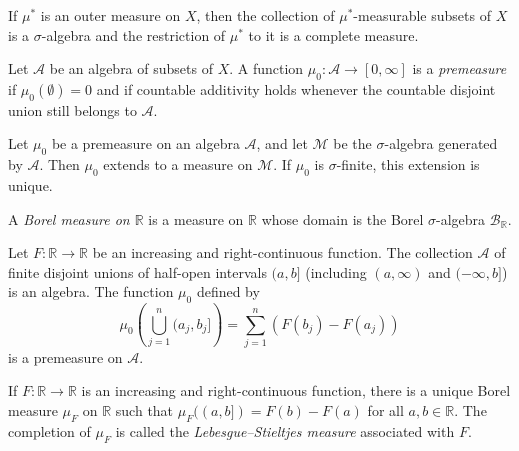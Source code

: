 \begin{theorem}[Caratheodory]
\label{theorem-caratheodory}
If $\mu^*$ is an outer measure on $X$, then
the collection of $\mu^*$-measurable subsets
of $X$ is a $\sigma$-algebra and the
restriction of $\mu^*$ to it is a complete
measure.
\end{theorem}

\begin{definition}
\label{definition-premeasure}
Let $\mathcal A$ be an algebra of subsets of
$X$. A function $\mu_0:\mathcal
A\to[0,\infty]$ is a {\it premeasure} if
$\mu_0(\emptyset)=0$ and if countable
additivity holds whenever the countable
disjoint union still belongs to $\mathcal A$.
\end{definition}

\begin{theorem}
\label{theorem-extension-premeasure}
Let $\mu_0$ be a premeasure on an algebra
$\mathcal A$, and let $\mathcal M$ be the
$\sigma$-algebra generated by $\mathcal A$.
Then $\mu_0$ extends to a measure on
$\mathcal M$. If $\mu_0$ is $\sigma$-finite,
this extension is unique.
\end{theorem}

\begin{definition}
\label{definition-borel-measure-r}
A {\it Borel measure on $\mathbb{R}$} is a
measure on $\mathbb{R}$ whose domain is the
Borel $\sigma$-algebra $\mathcal
B_{\mathbb{R}}$.
\end{definition}

\begin{proposition}
\label{proposition-premeasure-half-open}
Let $F:\mathbb{R}\to\mathbb{R}$ be an
increasing and right-continuous function. The
collection $\mathcal A$ of finite disjoint
unions of half-open intervals $(a,b]$
(including $(a,\infty)$ and $(-\infty,b]$) is
an algebra. The function $\mu_0$ defined by
$$
\mu_0\left(\bigcup_{j=1}^n (a_j, b_j]\right)
= \sum_{j=1}^n (F(b_j) - F(a_j))
$$
is a premeasure on $\mathcal A$.
\end{proposition}

\begin{theorem}
\label{theorem-lebesgue-stieltjes}
If $F:\mathbb{R}\to\mathbb{R}$ is an
increasing and right-continuous function,
there is a unique Borel measure $\mu_F$ on
$\mathbb{R}$ such that $\mu_F((a,b]) =
F(b)-F(a)$ for all $a,b\in\mathbb{R}$. The
completion of $\mu_F$ is called the {\it
Lebesgue--Stieltjes measure} associated with
$F$.
\end{theorem}

